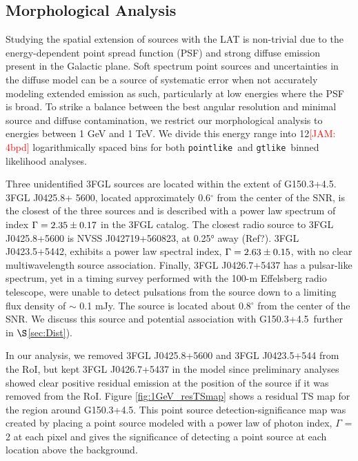 \documentclass[preprint2]{aastex}
\newcommand{\kibitz}[2]{\ifnum\Comments=1\textcolor{#1}{#2}\fi}
\newcommand{\jamie}[1]{\kibitz{red}      {[JAM: #1]}}
\newcommand{\ptlike}{{\tt pointlike}}
\newcommand{\gtlike}{{\tt gtlike}}
\newcommand{\Gone}{G150.3+4.5}
\begin{document}
\subsection{\label{sec:LATmorph}Morphological Analysis}
Studying the spatial extension of sources with the LAT is non-trivial due to the energy-dependent point spread function (PSF) and strong diffuse emission present in the Galactic plane. Soft spectrum point sources and uncertainties in the diffuse model can be a source of systematic error when not accurately modeling extended emission as such, particularly at low energies where the PSF is broad. To strike a balance between the best angular resolution and minimal source and diffuse contamination, we restrict our morphological analysis to energies between 1 GeV and 1 TeV. We divide this energy range into 12\jamie{4bpd} logarithmically spaced bins for both \ptlike~and \gtlike~binned likelihood analyses. 

Three  unidentified 3FGL sources are located within the extent of \Gone. 3FGL J0425.8+ 5600, located approximately 0.6$^\circ$ from the center of the SNR, is the closest of the three sources and is described with a power law spectrum of index ${\rm \Gamma = 2.35\pm 0.17}$  in the 3FGL catalog. The closest radio source to 3FGL J0425.8+5600 is NVSS J042719+560823, at 0.25° away (Ref?). 3FGL J0423.5+5442, exhibits a power law spectral index, ${\rm \Gamma = 2.63\pm 0.15}$, with no clear multiwavelength source association. Finally, 3FGL J0426.7+5437 has a pulsar-like spectrum, yet in a timing survey performed with the 100-m  Effelsberg radio telescope, \cite{Barr13} were unable to detect pulsations from the source down to a limiting flux density of $\sim$ 0.1 mJy. The source is located about 0.8$^{\circ}$ from the center of the SNR. We discuss this source and potential association with \Gone ~further in $\S$\ref{sec:Dist}). 

In our analysis, we removed 3FGL J0425.8+5600 and 3FGL J0423.5+544 from the RoI, but kept 3FGL J0426.7+5437 in the model since preliminary analyses showed clear positive residual emission at the position of the source if it was removed from the RoI. Figure \ref{fig:1GeV_resTSmap} shows a residual TS map for the region around \Gone. This point source detection-significance map was created by placing a point source modeled with a power law of photon index, $\Gamma$ = 2 at each pixel and gives the significance of detecting a point source at each location above the background. 
\end{document}
